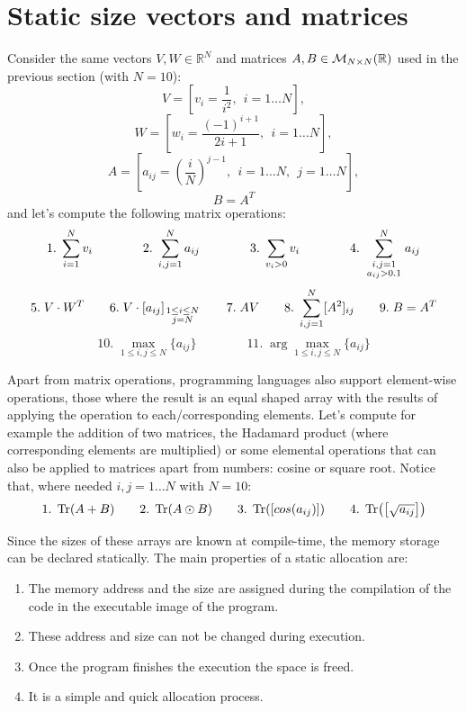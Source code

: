 \FloatBarrier


\newpage 
\section{Static size vectors and matrices} 

Consider the same vectors $V, W \in \mathbb{R}^N$ and matrices $A, B \in { \cal{M}}_{N \times N} (\mathbb{R})$ used in the previous section (with $N=10$): 
$$
V = \left[ v_i =\frac{1}{i^2}, \ \ i = 1 \ldots  N \right],
$$
$$
W = \left[ w_i = \frac{(-1)^{i+1}}{2i+1}, \ \ i = 1 \ldots  N \right],
$$
$$
A = \left[ a_{ij} = \left( \frac{i}{N} \right)^{j-1}, \ \ i = 1 \ldots  N, \ \ j = 1 \ldots  N \right],
$$
$$
B = A^T
$$
and let's compute the following matrix operations:
$$
1.\;\sum_{i=1}^N v_i  \qquad \qquad 2.\;\sum_{i,j=1}^N a_{ij}   \qquad \qquad   3.\;\sum_{v_i>0} v_i   \qquad \qquad 4.\;\sum_{\scriptstyle i,j=1 \atop \scriptstyle a_{ij} > 0.1}^N a_{ij}   
$$
$$
5.\; V\cdot W^T    \quad \quad      6.\; V\cdot [a_{ij}]_{\scriptstyle 1\leq i\leq N \atop \scriptstyle j = N}    \quad  \quad  7.\; AV     \quad \quad   8.\;\sum_{i,j=1}^N [A^2]_{ij}   \quad \quad    9.\; B = A^T
$$
$$
10.\;\max_{1\leq i,j\leq N} \{ a_{ij} \}       \qquad \qquad     11.\;\arg\max_{1\leq i,j\leq N} \{ a_{ij} \}   
$$

Apart from matrix operations, programming languages also support element-wise operations,
those where the result is an equal shaped array with the results of applying the operation to each/corresponding elements.
Let's compute for example the addition of two matrices, the Hadamard product (where corresponding elements are multiplied)
or some elemental operations that can also be applied to matrices apart from numbers: cosine or square root. 
Notice that, where needed $i,j = 1\ldots N$ with $N=10$:
$$
1.\;\Tr(A + B)  \quad \quad 2.\;\Tr(A\odot B)  \quad \quad   3.\;\Tr( \left[ cos( a_{ij} )\right] )   \quad \quad 4.\;\Tr( \left[ \sqrt{a_{ij}} \right] )
$$

Since the sizes of these arrays are known at compile-time, the memory storage can be declared statically. 
The main properties of a static allocation are:
\begin{enumerate}
    \item The memory address and the size are assigned during the compilation of the code in the executable image of the program.
    \item These address and size can not be changed during execution.
    \item Once the program finishes the execution the space is freed.
    \item It is a simple and quick allocation process.
\end{enumerate}




